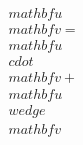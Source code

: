 \documentclass[preview]{standalone}
\begin{document}
\begin{align*}
\quad\\mathbf{u}  \quad\\mathbf{v}  = \quad\\mathbf{u} \quad\\cdot \quad\\mathbf{v} + \quad\\mathbf{u} \quad\\wedge \quad\\mathbf{v}
\end{align*}
\end{document}
